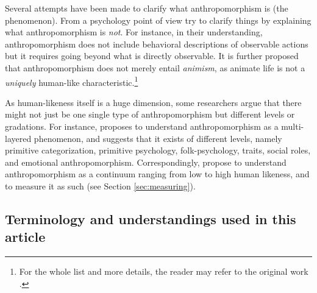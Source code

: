 \documentclass{frontiersSCNS} %
\begin{document}
Several attempts have been made to clarify what anthropomorphism is (the phenomenon).
From a psychology point of view \cite{epley_when_2008} try to clarify things by explaining what anthropomorphism is \textit{not}. For instance, in their understanding, anthropomorphism does not include behavioral descriptions of observable actions but it requires going beyond what is directly observable. It is further proposed that anthropomorphism does not merely entail \textit{animism}, as animate life is not a \textit{uniquely} human-like characteristic.\footnote{For the whole list and more details, the reader may refer to the original work \citep{epley_when_2008}.}




As human-likeness itself is a huge dimension, some researchers argue that there might not just be one single type of anthropomorphism but different levels or gradations. For instance, \cite{persson_anthropomorphism_2000} proposes to understand anthropomorphism as a multi-layered phenomenon, and suggests that it exists of different levels, namely primitive categorization, primitive psychology, folk-psychology, traits, social roles, and emotional anthropomorphism. Correspondingly, \cite{ruijten_introducing_2014} propose to understand anthropomorphism as a continuum ranging from low to high human likeness, and to measure it as such (see Section \ref{sec:measuring}). 


\subsection{Terminology and understandings used in this article}
\end{document}
